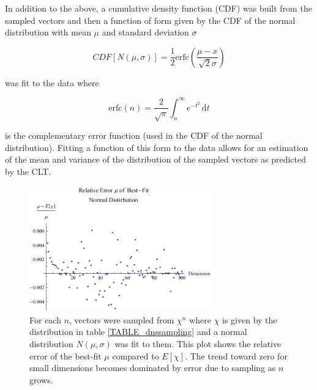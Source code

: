 \documentclass[12pt]{report}
\theoremstyle{remark}
\theoremstyle{definition}
\theoremstyle{definition}
\theoremstyle{definition}
\begin{document}
In addition to the above, a cumulative density function (CDF) was built from the
sampled vectors and then a function of form given by the CDF of the normal
distribution with mean $\mu$ and standard deviation $\sigma$

\begin{equation}
CDF[N(\mu,\sigma)]=\frac{1}{2} \text{erfc}\left(\frac{\mu -x}{\sqrt{2} \sigma}\right)
\end{equation}

was fit to the data where 

\begin{equation}
\textrm{erfc}(n)=\frac{2}{\sqrt{\pi}} \int_n^{\infty}
e^{-t^2}\,\mathrm dt
\end{equation}

is the complementary error function (used in the CDF of the normal
distribution). Fitting a function of this form to the data allows for an estimation
of the mean and variance of the distribution of the sampled vectors as predicted
by the CLT.

\begin{figure}
\centering
\includegraphics[width=0.7\textwidth]{figures/dnssampling-muerror.pdf}
\caption[Relative Error of $\mu$ of Best-Fit Normal Distribution of Sampled Expected Value]
{For each $n$, vectors were sampled from $\chi^n$ where $\chi$ is given by the
distribution in table \ref{TABLE_dnssampling} and a normal distribution
$N(\mu,\sigma)$ was fit to them. This plot shows the relative error of the
best-fit $\mu$ compared to $E[\chi]$. The trend toward zero for small dimensions
becomes dominated by error due to sampling as $n$ grows.}
\label{dnssampling-muerror}
\end{figure}
\end{document}
